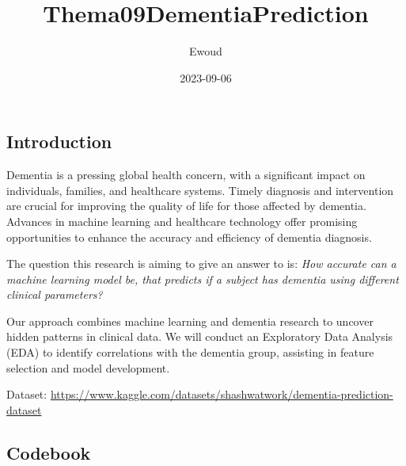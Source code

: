 \documentclass[
]{article}
\title{Thema09DementiaPrediction}
\author{Ewoud}
\date{2023-09-06}
\begin{document}
\maketitle

\hypertarget{introduction}{%
\subsection{Introduction}\label{introduction}}

Dementia is a pressing global health concern, with a significant impact
on individuals, families, and healthcare systems. Timely diagnosis and
intervention are crucial for improving the quality of life for those
affected by dementia. Advances in machine learning and healthcare
technology offer promising opportunities to enhance the accuracy and
efficiency of dementia diagnosis.

The question this research is aiming to give an answer to is: \emph{How
accurate can a machine learning model be, that predicts if a subject has
dementia using different clinical parameters?}

Our approach combines machine learning and dementia research to uncover
hidden patterns in clinical data. We will conduct an Exploratory Data
Analysis (EDA) to identify correlations with the dementia group,
assisting in feature selection and model development.

Dataset:
\url{https://www.kaggle.com/datasets/shashwatwork/dementia-prediction-dataset}

\hypertarget{codebook}{%
\subsection{Codebook}\label{codebook}}
\end{document}
